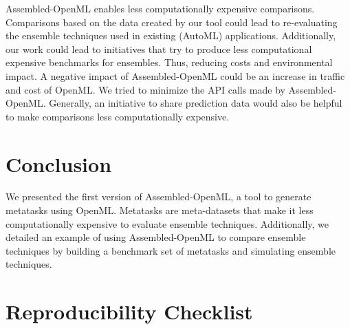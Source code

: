 \documentclass[11pt]{article}
\begin{document}
Assembled-OpenML enables less computationally expensive comparisons. Comparisons based on the data created by our tool could lead to re-evaluating the ensemble techniques used in existing (AutoML) applications.
Additionally, our work could lead to initiatives that try to produce less computational expensive benchmarks for ensembles. Thus, reducing costs and environmental impact. 
A negative impact of Assembled-OpenML could be an increase in traffic and cost of OpenML. We tried to minimize the API calls made by Assembled-OpenML. 
Generally, an initiative to share prediction data would also be helpful to make comparisons less computationally expensive. 

\section{Conclusion}
We presented the first version of Assembled-OpenML, a tool to generate metatasks using OpenML. Metatasks are meta-datasets that make it less computationally expensive to evaluate ensemble techniques. 
Additionally, we detailed an example of using Assembled-OpenML to compare ensemble techniques by building a benchmark set of metatasks and simulating ensemble techniques.


\newpage




\newpage
\section{Reproducibility Checklist}
\end{document}
